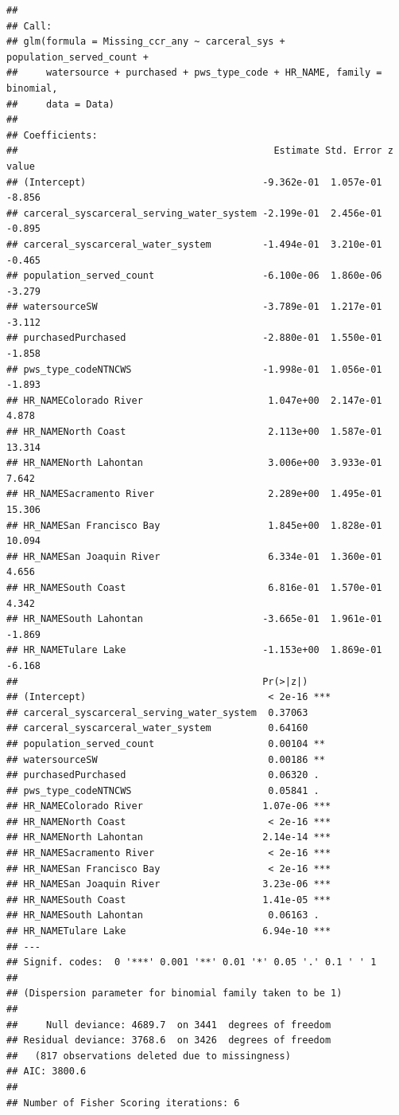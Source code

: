 \documentclass[
]{article}
\begin{document}
\begin{verbatim}
## 
## Call:
## glm(formula = Missing_ccr_any ~ carceral_sys + population_served_count + 
##     watersource + purchased + pws_type_code + HR_NAME, family = binomial, 
##     data = Data)
## 
## Coefficients:
##                                             Estimate Std. Error z value
## (Intercept)                               -9.362e-01  1.057e-01  -8.856
## carceral_syscarceral_serving_water_system -2.199e-01  2.456e-01  -0.895
## carceral_syscarceral_water_system         -1.494e-01  3.210e-01  -0.465
## population_served_count                   -6.100e-06  1.860e-06  -3.279
## watersourceSW                             -3.789e-01  1.217e-01  -3.112
## purchasedPurchased                        -2.880e-01  1.550e-01  -1.858
## pws_type_codeNTNCWS                       -1.998e-01  1.056e-01  -1.893
## HR_NAMEColorado River                      1.047e+00  2.147e-01   4.878
## HR_NAMENorth Coast                         2.113e+00  1.587e-01  13.314
## HR_NAMENorth Lahontan                      3.006e+00  3.933e-01   7.642
## HR_NAMESacramento River                    2.289e+00  1.495e-01  15.306
## HR_NAMESan Francisco Bay                   1.845e+00  1.828e-01  10.094
## HR_NAMESan Joaquin River                   6.334e-01  1.360e-01   4.656
## HR_NAMESouth Coast                         6.816e-01  1.570e-01   4.342
## HR_NAMESouth Lahontan                     -3.665e-01  1.961e-01  -1.869
## HR_NAMETulare Lake                        -1.153e+00  1.869e-01  -6.168
##                                           Pr(>|z|)    
## (Intercept)                                < 2e-16 ***
## carceral_syscarceral_serving_water_system  0.37063    
## carceral_syscarceral_water_system          0.64160    
## population_served_count                    0.00104 ** 
## watersourceSW                              0.00186 ** 
## purchasedPurchased                         0.06320 .  
## pws_type_codeNTNCWS                        0.05841 .  
## HR_NAMEColorado River                     1.07e-06 ***
## HR_NAMENorth Coast                         < 2e-16 ***
## HR_NAMENorth Lahontan                     2.14e-14 ***
## HR_NAMESacramento River                    < 2e-16 ***
## HR_NAMESan Francisco Bay                   < 2e-16 ***
## HR_NAMESan Joaquin River                  3.23e-06 ***
## HR_NAMESouth Coast                        1.41e-05 ***
## HR_NAMESouth Lahontan                      0.06163 .  
## HR_NAMETulare Lake                        6.94e-10 ***
## ---
## Signif. codes:  0 '***' 0.001 '**' 0.01 '*' 0.05 '.' 0.1 ' ' 1
## 
## (Dispersion parameter for binomial family taken to be 1)
## 
##     Null deviance: 4689.7  on 3441  degrees of freedom
## Residual deviance: 3768.6  on 3426  degrees of freedom
##   (817 observations deleted due to missingness)
## AIC: 3800.6
## 
## Number of Fisher Scoring iterations: 6
\end{verbatim}
\end{document}
